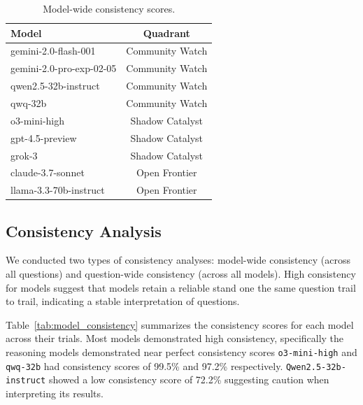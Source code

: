 \begin{table}[htbp]
    \centering
    \caption{Model-wide consistency scores.}
    \label{tab:model_quadrant}
    \begin{tabular}{l c}
        \hline
        Model & Quadrant \\
        \hline
        gemini-2.0-flash-001 & Community Watch \\
        gemini-2.0-pro-exp-02-05 & Community Watch \\
        qwen2.5-32b-instruct & Community Watch \\
        qwq-32b & Community Watch \\
        o3-mini-high & Shadow Catalyst \\
        gpt-4.5-preview & Shadow Catalyst \\
        grok-3 & Shadow Catalyst \\
        claude-3.7-sonnet & Open Frontier \\
        llama-3.3-70b-instruct & Open Frontier \\
        \hline
    \end{tabular}
\end{table}

\subsection{Consistency Analysis}

We conducted two types of consistency analyses: model-wide consistency (across all questions) and question-wide consistency (across all models). High consistency for models suggest that models retain a reliable stand one the same question trail to trail, indicating a stable interpretation of questions. 

Table~\ref{tab:model_consistency} summarizes the consistency scores for each model across their trials. Most models demonstrated high consistency, specifically the reasoning models demonstrated near perfect consistency scores \texttt{o3-mini-high} and \texttt{qwq-32b} had consistency scores of 99.5\% and 97.2\% respectively. \texttt{Qwen2.5-32b-instruct} showed a low consistency score of 72.2\% suggesting caution when interpreting its results.

